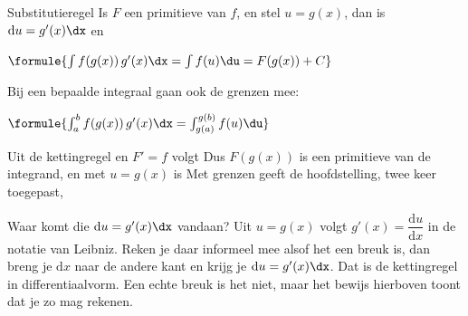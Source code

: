 \begin{theorie}
\begin{stelling}{Substitutieregel}
Is $F$ een primitieve van $f$, en stel $u = g(x)$, dan is $\mathrm{d}u = g'(x)\dx$ en

\vspace{1mm}
\qquad $\formule{\int f(g(x))\,g'(x)\dx = \int f(u)\du = F(g(x)) + C}$

\vspace{1.5mm}
Bij een bepaalde integraal gaan ook de grenzen mee:

\vspace{1mm}
\qquad $\formule{\int_a^b f(g(x))\,g'(x)\dx = \int_{g(a)}^{g(b)} f(u)\du}$
\end{stelling}

\begin{bewijs}
Uit de kettingregel en $F' = f$ volgt
Dus $F(g(x))$ is een primitieve van de integrand, en met $u = g(x)$ is
Met grenzen geeft de hoofdstelling, twee keer toegepast,
\end{bewijs}
\end{theorie}

Waar komt die $\mathrm{d}u = g'(x)\dx$ vandaan? Uit $u = g(x)$ volgt $g'(x) = \dfrac{\mathrm{d}u}{\mathrm{d}x}$ in de notatie van Leibniz. Reken je daar informeel mee alsof het een breuk is, dan breng je $\mathrm{d}x$ naar de andere kant en krijg je $\mathrm{d}u = g'(x)\dx$. Dat is de kettingregel in differentiaalvorm. Een echte breuk is het niet, maar het bewijs hierboven toont dat je zo mag rekenen.


